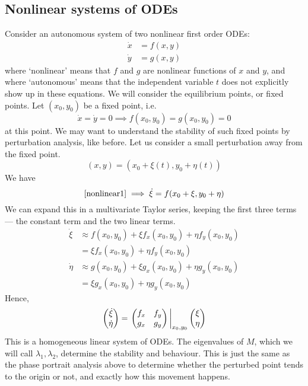 \subsection{Nonlinear systems of ODEs}
Consider an autonomous system of two nonlinear first order ODEs:
\begin{align}
	\label{nonlinear1} \dot x & = f(x, y) \\
	\label{nonlinear2} \dot y & = g(x, y)
\end{align}
where `nonlinear' means that \(f\) and \(g\) are nonlinear functions of \(x\) and \(y\), and where `autonomous' means that the independent variable \(t\) does not explicitly show up in these equations.
We will consider the equilibrium points, or fixed points.
Let \((x_0, y_0)\) be a fixed point, i.e.
\[
	\dot x = \dot y = 0 \implies f(x_0, y_0) = g(x_0, y_0) = 0
\]
at this point.
We may want to understand the stability of such fixed points by perturbation analysis, like before.
Let us consider a small perturbation away from the fixed point.
\[
	(x, y) = (x_0 + \xi(t), y_0 + \eta(t))
\]
We have
\[
	\eqref{nonlinear1} \implies \dot \xi = f(x_0 + \xi, y_0 + \eta)
\]
We can expand this in a multivariate Taylor series, keeping the first three terms --- the constant term and the two linear terms.
\begin{align*}
	\dot \xi  & \approx f(x_0, y_0) + \xi f_x(x_0, y_0) + \eta f_y(x_0, y_0) \\
	          & = \xi f_x(x_0, y_0) + \eta f_y(x_0, y_0)                     \\
	\dot \eta & \approx g(x_0, y_0) + \xi g_x(x_0, y_0) + \eta g_y(x_0, y_0) \\
	          & = \xi g_x(x_0, y_0) + \eta g_y(x_0, y_0)
\end{align*}
Hence,
\[
	\begin{pmatrix}
		\dot \xi \\ \dot \eta
	\end{pmatrix} = \eval{\begin{pmatrix}
			f_x & f_y \\ g_x & g_y
		\end{pmatrix}}_{x_0, y_0} \begin{pmatrix}
		\xi \\ \eta
	\end{pmatrix}
\]
This is a homogeneous linear system of ODEs.
The eigenvalues of \(M\), which we will call \(\lambda_1, \lambda_2\), determine the stability and behaviour.
This is just the same as the phase portrait analysis above to determine whether the perturbed point tends to the origin or not, and exactly how this movement happens.

